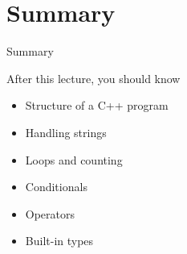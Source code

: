 \documentclass[12pt]{beamer}
\begin{document}
\section{Summary}

\begin{frame}{Summary}
\begin{block}{After this lecture, you should know}
\begin{itemize}
\item Structure of a C++ program
\item Handling strings
\item Loops and counting
\item Conditionals
\item Operators
\item Built-in types
\end{itemize}

\end{block}


\end{frame}
\end{document}
